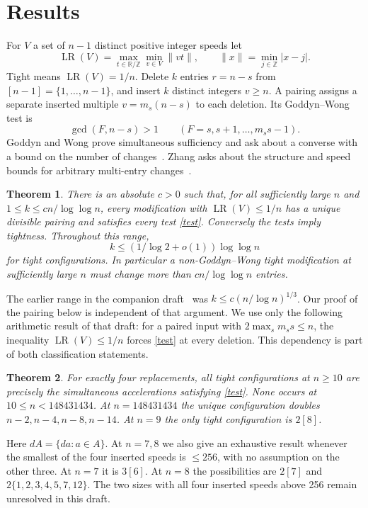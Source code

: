 \documentclass[11pt,a4paper]{article}
\newtheorem{thm}{Theorem}
\newcommand{\LR}{\operatorname{LR}}
\newcommand{\dist}[1]{\lVert#1\rVert}
\begin{document}
\section{Results}
For $V$ a set of $n-1$ distinct positive integer speeds let
\[
 \LR(V)=\max_{t\in\mathbb R/\mathbb Z}\min_{v\in V}\dist{vt},
 \qquad \dist{x}=\min_{j\in\mathbb Z}|x-j|.
\]
Tight means $\LR(V)=1/n$. Delete $k$ entries $r=n-s$ from $[n-1]=\{1,\ldots,n-1\}$, and insert $k$ distinct integers $v\ge n$. A pairing assigns a separate inserted multiple $v=m_s(n-s)$ to each deletion. Its Goddyn--Wong test is
\begin{equation}\label{test}
 \gcd(F,n-s)>1\qquad (F=s,s+1,\ldots,m_s s-1).
\end{equation}
Goddyn and Wong prove simultaneous sufficiency and ask about a converse with a bound on the number of changes~\cite[Sec.~3]{GW}. Zhang asks about the structure and speed bounds for arbitrary multi-entry changes~\cite[Questions 8.2--8.3]{Z}.
\begin{thm}\label{gap}
There is an absolute $c>0$ such that, for all sufficiently large $n$ and $1\le k\le c n/\log\log n$, every modification with $\LR(V)\le1/n$ has a unique divisible pairing and satisfies every test \eqref{test}. Conversely the tests imply tightness. Throughout this range,
\[
 k\le(1/\log2+o(1))\log\log n
\]
for tight configurations. In particular a non-Goddyn--Wong tight modification at sufficiently large $n$ must change more than $c n/\log\log n$ entries.
\end{thm}
The earlier range in the companion draft~\cite[Cor.~2]{C} was $k\le c(n/\log n)^{1/3}$. Our proof of the pairing below is independent of that argument. We use only the following arithmetic result of that draft: for a paired input with $2\max_s m_s s\le n$, the inequality $\LR(V)\le1/n$ forces \eqref{test} at every deletion. This dependency is part of both classification statements.
\begin{thm}\label{four}
For exactly four replacements, all tight configurations at $n\ge10$ are precisely the simultaneous accelerations satisfying \eqref{test}. None occurs at $10\le n<148431434$. At $n=148431434$ the unique configuration doubles $n-2,n-4,n-8,n-14$. At $n=9$ the only tight configuration is $2[8]$.
\end{thm}
Here $dA=\{da:a\in A\}$. At $n=7,8$ we also give an exhaustive result whenever the smallest of the four inserted speeds is $\le256$, with no assumption on the other three. At $n=7$ it is $3[6]$. At $n=8$ the possibilities are $2[7]$ and $2\{1,2,3,4,5,7,12\}$. The two sizes with all four inserted speeds above 256 remain unresolved in this draft.
\end{document}
